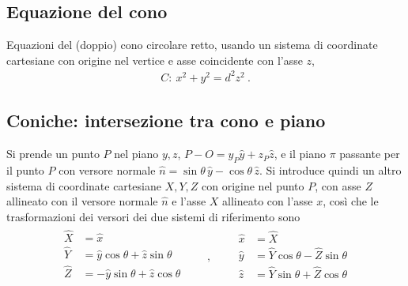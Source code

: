 \documentclass[letterpaper,10pt,italian]{jupyterBook}
\begin{document}
\subsection{Equazione del cono}
\label{\detokenize{ch/analytic_geometry/analytic_geometry_3d/cone:equazione-del-cono}}\label{\detokenize{ch/analytic_geometry/analytic_geometry_3d/cone:geometry-analytic-3d-cone-eqn}}
\sphinxAtStartPar
Equazioni del (doppio) cono circolare retto, usando un sistema di coordinate cartesiane con origine nel vertice e asse coincidente con l’asse \(z\),
\begin{equation*}
\begin{split}C: \ x^2 + y^2 = d^2 z^2 \ .\end{split}
\end{equation*}

\subsection{Coniche: intersezione tra cono e piano}
\label{\detokenize{ch/analytic_geometry/analytic_geometry_3d/cone:coniche-intersezione-tra-cono-e-piano}}\label{\detokenize{ch/analytic_geometry/analytic_geometry_3d/cone:geometry-analytic-3d-cone-conics}}
\sphinxAtStartPar
Si prende un punto \(P\) nel piano \(y,z\), \(P-O = y_P \hat{y} + z_P \hat{z}\), e il piano \(\pi\) passante per il punto \(P\) con versore normale \(\hat{n} = \sin \theta \, \hat{y} - \cos \theta \, \hat{z}\). Si introduce quindi un altro sistema di coordinate cartesiane \(X,Y,Z\) con origine nel punto \(P\), con asse \(Z\) allineato con il versore normale \(\hat{n}\) e l’asse \(X\) allineato con l’asse \(x\), così che le trasformazioni dei versori dei due sistemi di riferimento sono
\begin{equation*}
\begin{split}
\begin{aligned}
 \hat{X} & = \hat{x} \\
 \hat{Y} & = \hat{y} \cos \theta + \hat{z} \sin \theta \\
 \hat{Z} & =-\hat{y} \sin \theta + \hat{z} \cos \theta \\
\end{aligned}
\qquad , \qquad
\begin{aligned}
 \hat{x} & = \hat{X} \\
 \hat{y} & = \hat{Y} \cos \theta - \hat{Z} \sin \theta \\
 \hat{z} & = \hat{Y} \sin \theta + \hat{Z} \cos \theta \\
\end{aligned}
\end{split}
\end{equation*}
\end{document}
